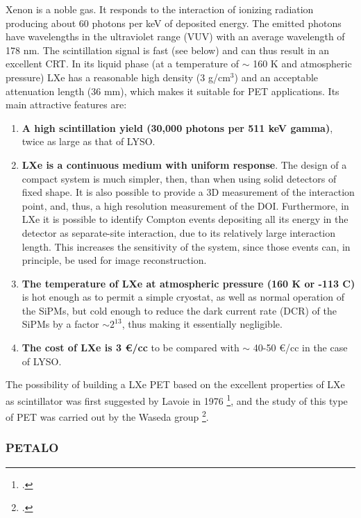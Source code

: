 Xenon is a noble gas. It responds to the interaction of ionizing radiation producing about 60 photons per keV of deposited energy. The emitted photons have wavelengths in the ultraviolet range (VUV)
with an average wavelength of 178 nm. The scintillation signal is fast 
(see below) and can thus result in an excellent CRT.  In its liquid phase (at a temperature of $\sim$ 160 K and atmospheric pressure) LXe has a reasonable high density (3 g/cm$^3$) and an acceptable attenuation length (36 mm), which makes it suitable for PET applications. Its main attractive features are:

\begin{enumerate}
\item {\bf A high scintillation yield (30,000 photons per 511 keV gamma)}, twice as large as that of LYSO. 
\item {\bf LXe is a continuous medium with uniform response}. The design of a compact system is much simpler, then, than when using solid detectors of fixed shape. It is also possible to provide a 3D measurement of the interaction point, and, thus, a high resolution measurement of the DOI. Furthermore, in LXe it is possible to identify Compton events depositing all its energy in the detector as separate-site interaction, due to its relatively large interaction length. This increases the sensitivity of the system, since those events can, in principle, be used for image reconstruction. 
\item {\bf The temperature of LXe at atmospheric pressure (160 K or -113 C)} is hot enough as to permit a simple cryostat, as well as normal operation of the SiPMs, but cold enough to reduce the dark current rate (DCR) of the SiPMs by a factor $\sim 2^{13}$, thus making it essentially negligible. 
\item {\bf The cost of LXe is 3 \euro/cc} to be compared with $\sim$ 40-50 \euro/cc in the case of LYSO. 
 \end{enumerate}

The possibility of building a LXe PET based on the excellent properties of LXe as scintillator was first suggested by Lavoie in 1976  \footcite{lavoie}, and the study of this type of PET was carried out by the Waseda group \footcite{Doke1,Nishikido2,Nishikido1}. 

\subsubsection*{PETALO}


